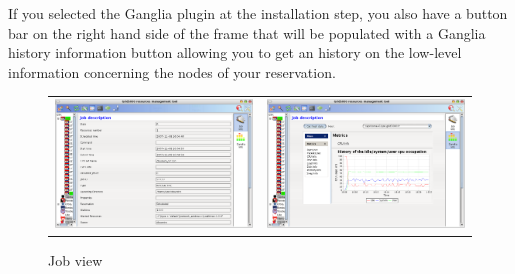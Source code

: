 \begin{itemize}
  If you selected the Ganglia plugin at the installation step, you also have a
  button bar on the right hand side of the frame that will be populated with a
  Ganglia history information button allowing you to get an history on the
  low-level information concerning the nodes of your reservation. \begin{figure}[H]
  \centering
  \begin{tabular}{cc}
  \includegraphics[width=0.5\linewidth]{figures/GRUDU_interface4.eps} &
  \includegraphics[width=0.5\linewidth]{figures/GRUDU_interface4_ganglia.eps}
  \end{tabular}
	\caption{Job view}
	\label{fig:GRUDU_view_job}
  \end{figure}
\end{itemize}

